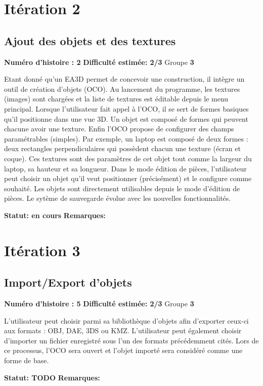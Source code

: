 \documentclass[a4paper]{article} \usepackage{framed} \usepackage{fullpage} \usepackage[french]{babel} \usepackage[utf8]{inputenc} \usepackage[T1]{fontenc}
\begin{document}
\section{Itération 2}
\begin{framed}
\subsection{Ajout des objets et des textures}

\textbf{Numéro d'histoire : 2}  
\textbf{Difficulté estimée: 2/3}  Groupe \textbf{3}

Etant donné qu'un EA3D permet de concevoir une construction, il intègre un outil de création d'objets (OCO). Au lancement du programme, les textures (images) sont chargées et la liste de textures est éditable depuis le menu principal.
Lorsque l'utilisateur fait appel à l'OCO, il se sert de formes basiques qu'il positionne dans une vue 3D. Un objet est composé de formes qui peuvent chacune avoir une texture. Enfin l'OCO propose de configurer des champs paramétrables (simples). Par exemple, un laptop est composé de deux formes : deux rectangles perpendiculaires qui possèdent chacun une texture (écran et coque). Ces textures sont des paramètres de cet objet tout comme la largeur du laptop, sa hauteur et sa longueur.
Dans le mode édition de pièces, l'utilisateur peut choisir un objet qu'il veut positionner (précisément) et le configure comme souhaité. Les objets sont directement utilisables depuis le mode d'édition de pièces. Le sytème de sauvegarde évolue avec les nouvelles fonctionnalités.

\textbf{Statut: en cours}  \textbf{Remarques:}
\end{framed}

\section{Itération 3}
\begin{framed}
\subsection{Import/Export d'objets}

\textbf{Numéro d'histoire : 5}  
\textbf{Difficulté estimée: 2/3}  Groupe \textbf{3}

L'utilisateur peut choisir parmi sa bibliothèque d'objets afin d'exporter ceux-ci aux formats : OBJ, DAE, 3DS ou KMZ.
L'utilisateur peut également choisir d'importer un fichier enregistré sous l'un des formats précédemment cités. Lors de ce processus, l'OCO sera ouvert et l'objet importé sera considéré comme une forme de base.

\textbf{Statut: TODO}  \textbf{Remarques:}
\end{framed}
\end{document}
